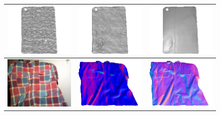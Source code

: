 \begin{figure}[!ht]
{\begin{tabular}{c|c c}
   \includegraphics[height = 0.24\linewidth]{figures/result/robust_padback_shape_init.pdf} 
   &
   \includegraphics[height = 0.24\linewidth]{figures/result/rgbd_padback_shape.pdf} &
   \includegraphics[height = 0.24\linewidth]{figures/result/robust_padback_shape.pdf}\\
\hline
   \includegraphics[height = 0.24\linewidth]{figures/result/robust_patternShirt_rgb.png} 
   &
   \includegraphics[height = 0.24\linewidth]{figures/result/rgbd_patternShirt_normal.png} &
   \includegraphics[height = 0.24\linewidth]{figures/result/robust_patternShirt_normal.png} \\


\end{tabular}}
\end{figure}
